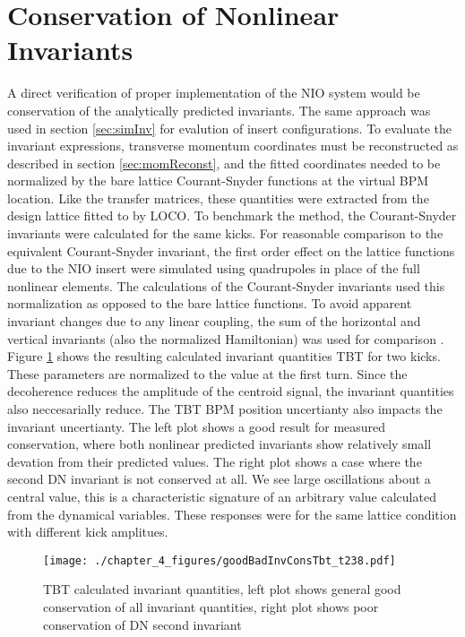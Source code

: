 \section{Conservation of Nonlinear Invariants} \label{sec:invConv}
A direct verification of proper implementation of the NIO system would be conservation of the analytically predicted invariants. The same approach was used in section \ref{sec:simInv} for evalution of insert configurations. To evaluate the invariant expressions, transverse momentum coordinates must be reconstructed as described in section \ref{sec:momReconst}, and the fitted coordinates needed to be normalized by the bare lattice Courant-Snyder functions at the virtual BPM location. Like the transfer matrices, these quantities were extracted from the design lattice fitted to by LOCO. To benchmark the method, the Courant-Snyder invariants were calculated for the same kicks. For reasonable comparison to the equivalent Courant-Snyder invariant, the first order effect on the lattice functions due to the NIO insert were simulated using quadrupoles in place of the full nonlinear elements. The calculations of the Courant-Snyder invariants used this normalization as opposed to the bare lattice functions. To avoid apparent invariant changes due to any linear coupling, the sum of the horizontal and vertical invariants (also the normalized Hamiltonian) was used for comparison \cite{leeAccelerator}.  Figure \ref{fig:invTbt} shows the resulting calculated invariant quantities TBT for two kicks. These parameters are normalized to the value at the first turn. Since the decoherence reduces the amplitude of the centroid signal, the invariant quantities also neccesarially reduce. The TBT BPM position uncertianty also impacts the invariant uncertianty. The left plot shows a good result for measured conservation, where both nonlinear predicted invariants show relatively small devation from their predicted values. The right plot shows a case where the second DN invariant is not conserved at all. We see large oscillations about a central value, this is a characteristic signature of an arbitrary value calculated from the dynamical variables. These responses were for the same lattice condition with different kick amplitues.

\begin{figure}
	\centering
	\texttt{[image: ./chapter\_4\_figures/goodBadInvConsTbt\_t238.pdf]}
	\caption{TBT calculated invariant quantities, left plot shows general good conservation of all invariant quantities, right plot shows poor conservation of DN second invariant}
	\label{fig:invTbt}
\end{figure}

